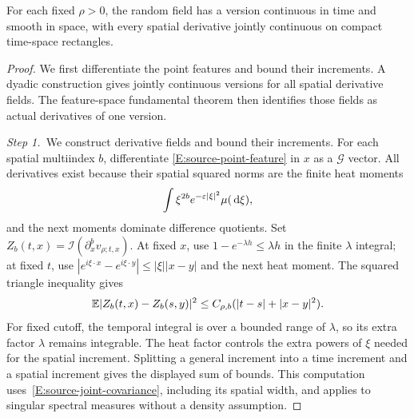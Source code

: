 \begin{lemma}\label{L:source-pointfield-regularity}
  For each fixed $\rho > 0$, the random field has a version continuous in time
  and smooth in space, with every spatial derivative jointly continuous on
  compact time-space rectangles.
\end{lemma}

\begin{proof}
  We first differentiate the point features and bound their increments. A
  dyadic construction gives jointly continuous versions for all spatial
  derivative fields. The feature-space fundamental theorem then identifies
  those fields as actual derivatives of one version.

  \medskip
  \noindent\textit{Step 1.~}We construct derivative fields and bound their
  increments.
  For each spatial multiindex $b$, differentiate \eqref{E:source-point-feature}
  in $x$ as a $\mathcal{G}$ vector. All derivatives exist because their spatial
  squared norms are the finite heat moments
  \[
    \int \xi^{2b}e^{-\varepsilon|\xi|^2}\mu(\,\mathrm{d}\xi),
  \]
  and the next moments dominate difference quotients. Set $Z_b(t,x) =
  \mathcal{I}(\partial_x^bv_{\rho;t,x})$. At fixed $x$, use $1-e^{-\lambda h}
  \le \lambda h$ in the finite $\lambda$ integral; at fixed $t$, use
  $|e^{i\xi\cdot x}-e^{i\xi\cdot y}| \le |\xi||x-y|$ and the next heat moment.
  The squared triangle inequality gives
  \begin{equation}\label{E:source-derivative-increments}
    \mathbb{E}|Z_b(t,x)-Z_b(s,y)|^2
    \le C_{\rho,b}(|t-s|+|x-y|^2).
  \end{equation}
  For fixed cutoff, the temporal integral is over a bounded range of
  $\lambda$, so its extra factor $\lambda$ remains integrable. The heat factor
  controls the extra powers of $\xi$ needed for the spatial increment.
  Splitting a general increment into a time increment and a spatial increment
  gives the displayed sum of bounds.
  This computation uses~\eqref{E:source-joint-covariance}, including its spatial
  width, and applies to singular spectral measures without a density assumption.


\end{proof}

